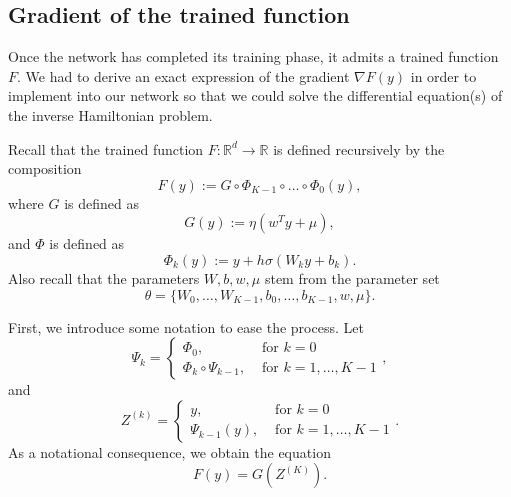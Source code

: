 \documentclass{article}
\begin{document}
\subsection{Gradient of the trained function}
Once the network has completed its training phase, it admits a trained function $F$. We had to derive an exact expression of the gradient $\nabla F(y)$ in order to implement into our network so that we could solve the differential equation(s) of the inverse Hamiltonian problem.

Recall that the trained function $F \colon \mathbb{R}^d \to \mathbb{R}$ is defined recursively by the composition
\begin{equation}
    F(y) := G\circ \Phi_{K-1}\circ \dots \circ \Phi_0(y),
\end{equation}
where $G$ is defined as
\[G(y) := \eta(w^Ty+\mu),\]
and $\Phi$ is defined as
\[\Phi_k(y) := y + h\sigma(W_k y+b_k).\]
Also recall that the parameters $W, b, w, \mu$ stem from the parameter set 
\[\theta = \{W_0,\ldots,W_{K-1},b_0,\ldots,b_{K-1}, w,\mu \}.\] 

First, we introduce some notation to ease the process. Let 
\[\Psi_k =\begin{cases}
    \Phi_0, & \text{ for $k = 0$} \\
    \Phi_k \circ \Psi_{k-1}, & \text{ for $k = 1,\ldots, K-1$}
\end{cases},\]
and \[Z^{(k)} =\begin{cases}
    y, & \text{ for $k = 0$} \\
    \Psi_{k-1}(y), & \text{ for $k = 1,\ldots, K-1$}
\end{cases}. \]
As a notational consequence, we obtain the equation 
\begin{equation}
    \label{eq:this}
    F(y)=G(Z^{(K)}).
\end{equation} 
\end{document}

